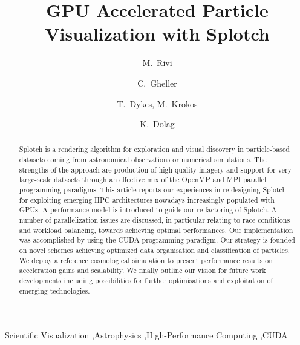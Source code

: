 \documentclass[preprint,5pt]{elsarticle}
\begin{document}
\begin{frontmatter}

\title{GPU Accelerated Particle Visualization with Splotch}

\author{M.~Rivi}
\address{Department of Physics, University of Oxford, OX1 3RH, United Kingdom}
      
\author{C.~Gheller}
\address{ETH-CSCS, via Trevano 131, 6900 Lugano, Switzerland}
  
\author{T.~Dykes, M.~Krokos}
\address{School of Creative Technologies, University of Portsmouth, PO1 2DJ, United Kingdom}

\author{K.~Dolag}
\address{University Observatory Munich, Scheinerstrasse 1, D-81679 Munich, Germany}



\maketitle

\begin{abstract}
Splotch is a rendering algorithm for exploration and visual discovery in
particle-based datasets coming from astronomical observations or
numerical simulations. The strengths of the approach are production of
high quality imagery and support for very large-scale datasets through an
effective mix of the OpenMP and MPI parallel programming paradigms. This
article reports our experiences in re-designing Splotch for exploiting
emerging HPC architectures nowadays increasingly populated with GPUs. A
performance model is introduced to guide our re-factoring of Splotch.  A number of
parallelization issues are discussed, in particular relating to race
conditions and workload balancing, towards achieving optimal
performances. Our implementation was accomplished by using the CUDA
programming paradigm. Our strategy is founded on novel schemes achieving optimized data organisation and classification of particles. We deploy a reference cosmological simulation to present
performance results on acceleration gains and scalability. We finally
outline our vision for future work developments including possibilities
for further optimisations and exploitation of emerging technologies.
\end{abstract}

\begin{keyword}
Scientific Visualization \sep Astrophysics \sep High-Performance  Computing \sep CUDA 
\end{keyword}

\end{frontmatter}
\end{document}
